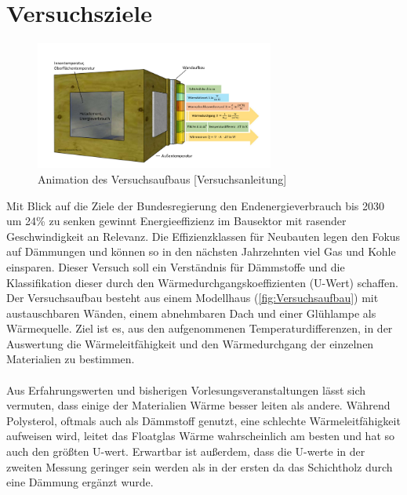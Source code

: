 \section{Versuchsziele}
\begin{figure}[!h]
		\centering
		\includegraphics[width=0.7\textwidth]{Abbildungen/Thurow_Deckblatt}
		\caption{Animation des Versuchsaufbaus [Versuchsanleitung] }
		\label{fig:Versuchsaufbau}
\end{figure}

Mit Blick auf die Ziele der Bundesregierung den Endenergieverbrauch bis 2030 um 24\% zu senken gewinnt Energieeffizienz im Bausektor mit rasender Geschwindigkeit 
an Relevanz. Die Effizienzklassen für Neubauten legen den Fokus auf Dämmungen und können so in den nächsten Jahrzehnten viel Gas und Kohle einsparen. 
Dieser Versuch soll ein Verständnis für Dämmstoffe und die Klassifikation dieser durch den Wärmedurchgangskoeffizienten (U-Wert) schaffen.  
Der Versuchsaufbau besteht aus einem Modellhaus (\autoref{fig:Versuchsaufbau}) mit austauschbaren Wänden, einem abnehmbaren Dach und einer Glühlampe als Wärmequelle.
 Ziel ist es, aus den aufgenommenen Temperaturdifferenzen, in der Auswertung die Wärmeleitfähigkeit und den Wärmedurchgang der einzelnen Materialien zu bestimmen.\\\\
Aus Erfahrungswerten und bisherigen Vorlesungsveranstaltungen lässt sich vermuten, dass einige der Materialien Wärme besser leiten als andere. 
Während Polysterol, oftmals auch als Dämmstoff genutzt, eine schlechte Wärmeleitfähigkeit aufweisen wird, leitet das Floatglas Wärme wahrscheinlich am besten und 
hat so auch den größten U-wert. Erwartbar ist außerdem, dass die U-werte in der zweiten Messung geringer sein werden als in der ersten da das Schichtholz durch 
eine Dämmung ergänzt wurde.